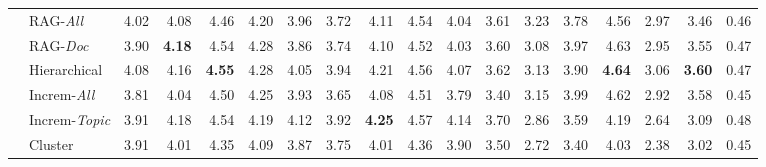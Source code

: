 \begin{table*}[]
\begin{tabular}{@{}clrrrrrrrrrrrrrrrc@{}}
 & \multicolumn{1}{l|}{RAG-\textit{All}} & \cellcolor[HTML]{DAE8FC}4.02 & \cellcolor[HTML]{DAE8FC}4.08 & \cellcolor[HTML]{DAE8FC}4.46 & \cellcolor[HTML]{DAE8FC}4.20 & \multicolumn{1}{r|}{\cellcolor[HTML]{DAE8FC}3.96} & 3.72 & 4.11 & \cellcolor[HTML]{DAE8FC}4.54 & 4.04 & \multicolumn{1}{r|}{3.61} & \cellcolor[HTML]{DAE8FC}3.23 & \cellcolor[HTML]{DAE8FC}3.78 & \cellcolor[HTML]{DAE8FC}4.56 & \cellcolor[HTML]{DAE8FC}2.97 & \multicolumn{1}{r|}{\cellcolor[HTML]{DAE8FC}3.46} & 0.46 \\
 & \multicolumn{1}{l|}{RAG-\textit{Doc}} & 3.90 & \cellcolor[HTML]{DAE8FC}\textbf{4.18} & \cellcolor[HTML]{DAE8FC}4.54 & \cellcolor[HTML]{DAE8FC}4.28 & \multicolumn{1}{r|}{3.86} & 3.74 & 4.10 & \cellcolor[HTML]{DAE8FC}4.52 & 4.03 & \multicolumn{1}{r|}{3.60} & \cellcolor[HTML]{DAE8FC}3.08 & \cellcolor[HTML]{DAE8FC}3.97 & \cellcolor[HTML]{DAE8FC}4.63 & \cellcolor[HTML]{DAE8FC}2.95 & \multicolumn{1}{r|}{\cellcolor[HTML]{DAE8FC}3.55} & 0.47 \\
 & \multicolumn{1}{l|}{Hierarchical} & 4.08 & \cellcolor[HTML]{DAE8FC}4.16 & \cellcolor[HTML]{DAE8FC}\textbf{4.55} & \cellcolor[HTML]{DAE8FC}4.28 & \multicolumn{1}{r|}{\cellcolor[HTML]{DAE8FC}4.05} & \cellcolor[HTML]{DAE8FC}3.94 & \cellcolor[HTML]{DAE8FC}4.21 & \cellcolor[HTML]{DAE8FC}4.56 & 4.07 & \multicolumn{1}{r|}{3.62} & \cellcolor[HTML]{DAE8FC}3.13 & \cellcolor[HTML]{DAE8FC}3.90 & \cellcolor[HTML]{DAE8FC}\textbf{4.64} & \cellcolor[HTML]{DAE8FC}3.06 & \multicolumn{1}{r|}{\cellcolor[HTML]{DAE8FC}\textbf{3.60}} & 0.47 \\
 & \multicolumn{1}{l|}{Increm-\textit{All}} & 3.81 & \cellcolor[HTML]{DAE8FC}4.04 & \cellcolor[HTML]{DAE8FC}4.50 & \cellcolor[HTML]{DAE8FC}4.25 & \multicolumn{1}{r|}{\cellcolor[HTML]{DAE8FC}3.93} & 3.65 & 4.08 & \cellcolor[HTML]{DAE8FC}4.51 & 3.79 & \multicolumn{1}{r|}{3.40} & \cellcolor[HTML]{DAE8FC}3.15 & \cellcolor[HTML]{DAE8FC}3.99 & \cellcolor[HTML]{DAE8FC}4.62 & \cellcolor[HTML]{DAE8FC}2.92 & \multicolumn{1}{r|}{\cellcolor[HTML]{DAE8FC}3.58} & 0.45 \\
 & \multicolumn{1}{l|}{Increm-\textit{Topic}} & \cellcolor[HTML]{DAE8FC}3.91 & \cellcolor[HTML]{DAE8FC}4.18 & \cellcolor[HTML]{DAE8FC}4.54 & \cellcolor[HTML]{DAE8FC}4.19 & \multicolumn{1}{r|}{\cellcolor[HTML]{DAE8FC}4.12} & \cellcolor[HTML]{DAE8FC}3.92 & \cellcolor[HTML]{DAE8FC}\textbf{4.25} & \cellcolor[HTML]{DAE8FC}4.57 & \cellcolor[HTML]{DAE8FC}4.14 & \multicolumn{1}{r|}{3.70} & 2.86 & 3.59 & 4.19 & 2.64 & \multicolumn{1}{r|}{3.09} & 0.48 \\
 & \multicolumn{1}{l|}{Cluster} & \cellcolor[HTML]{DAE8FC}3.91 & 4.01 & 4.35 & 4.09 & \multicolumn{1}{r|}{3.87} & 3.75 & 4.01 & 4.36 & 3.90 & \multicolumn{1}{r|}{3.50} & 2.72 & 3.40 & 4.03 & 2.38 & \multicolumn{1}{r|}{3.02} & 0.45 \\

\end{tabular}
\end{table*}
